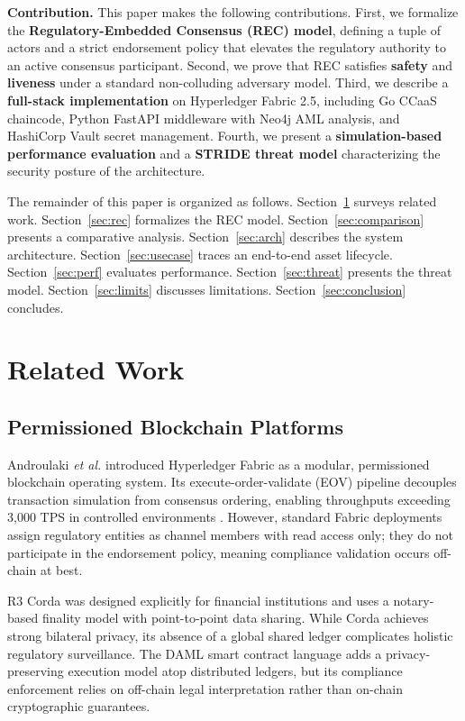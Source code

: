 \documentclass[journal,10pt,twocolumn]{IEEEtran}
\begin{document}
\textbf{Contribution.} This paper makes the following contributions. First, we formalize the \textbf{Regulatory-Embedded Consensus (REC) model}, defining a tuple of actors and a strict endorsement policy that elevates the regulatory authority to an active consensus participant. Second, we prove that REC satisfies \textbf{safety} and \textbf{liveness} under a standard non-colluding adversary model. Third, we describe a \textbf{full-stack implementation} on Hyperledger Fabric 2.5, including Go CCaaS chaincode, Python FastAPI middleware with Neo4j AML analysis, and HashiCorp Vault secret management. Fourth, we present a \textbf{simulation-based performance evaluation} and a \textbf{STRIDE threat model} characterizing the security posture of the architecture.

The remainder of this paper is organized as follows. Section~\ref{sec:related} surveys related work. Section~\ref{sec:rec} formalizes the REC model. Section~\ref{sec:comparison} presents a comparative analysis. Section~\ref{sec:arch} describes the system architecture. Section~\ref{sec:usecase} traces an end-to-end asset lifecycle. Section~\ref{sec:perf} evaluates performance. Section~\ref{sec:threat} presents the threat model. Section~\ref{sec:limits} discusses limitations. Section~\ref{sec:conclusion} concludes.

\section{Related Work}
\label{sec:related}

\subsection{Permissioned Blockchain Platforms}

Androulaki \textit{et al.} \cite{ref:fabric} introduced Hyperledger Fabric as a modular, permissioned blockchain operating system. Its execute-order-validate (EOV) pipeline decouples transaction simulation from consensus ordering, enabling throughputs exceeding 3,000 TPS in controlled environments \cite{ref:manevich}. However, standard Fabric deployments assign regulatory entities as channel members with read access only; they do not participate in the endorsement policy, meaning compliance validation occurs off-chain at best.

R3 Corda \cite{ref:corda} was designed explicitly for financial institutions and uses a notary-based finality model with point-to-point data sharing. While Corda achieves strong bilateral privacy, its absence of a global shared ledger complicates holistic regulatory surveillance. The DAML smart contract language \cite{ref:daml} adds a privacy-preserving execution model atop distributed ledgers, but its compliance enforcement relies on off-chain legal interpretation rather than on-chain cryptographic guarantees.
\end{document}
